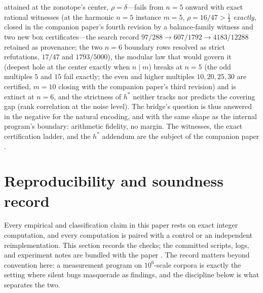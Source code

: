\documentclass[11pt,a4paper]{article}
\numberwithin{equation}{section}
\theoremstyle{plain}
\theoremstyle{definition}
\theoremstyle{remark}
\begin{document}
\begin{enumerate}[leftmargin=1.7em,itemsep=4pt]
  attained at the zonotope's center, $\rho=\delta$---fails from $n=5$
  onward with exact rational witnesses (at the harmonic $n=5$ instance
  $m=5$, $\rho=16/47>\tfrac13$ \emph{exactly}, closed in the companion
  paper's fourth revision by a balance-family witness and two new box
  certificates---the search record
  $97/288\to607/1792\to4183/12288$ retained as provenance; the two
  $n=6$ boundary rows resolved as strict refutations, $17/47$ and
  $1793/5000$), the modular law that would
  govern it (deepest hole at the center exactly when $n\mid m$) breaks
  at $n=5$ (the odd multiples $5$ and $15$ fail exactly; the even and
  higher multiples $10,20,25,30$ are certified, $m=10$ closing with
  the companion paper's third revision) and is extinct at $n=6$, and
  the strictness of $h^*$ neither
  tracks nor predicts the covering gap (rank correlation at the noise
  level). The bridge's question is thus answered in the negative for
  the natural encoding, and with the same shape as the internal
  program's boundary: arithmetic fidelity, no margin. The witnesses,
  the exact certification ladder, and the $h^*$ addendum are the
  subject of the companion paper \cite{companion-paper}.
\end{enumerate}


\section{Reproducibility and soundness record}\label{sec:sound}

Every empirical and classification claim in this paper rests on exact
integer computation, and every computation is paired with a control or an
independent reimplementation. This section records the checks; the
committed scripts, logs, and experiment notes are bundled with the paper
\cite{prog-artifacts}. The record matters beyond convention here: a
measurement program on $10^6$-scale corpora is exactly the setting where
silent bugs masquerade as findings, and the discipline below is what
separates the two.
\end{document}
